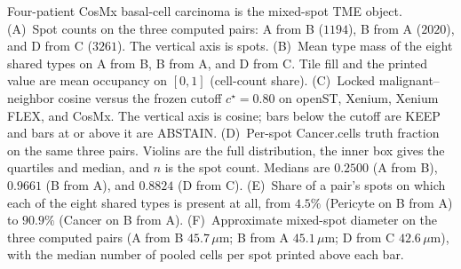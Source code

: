Four-patient CosMx basal-cell carcinoma is the mixed-spot TME object. (A)~Spot counts on the three computed pairs: A from B (\(1194\)), B from A (\(2020\)), and D from C (\(3261\)). The vertical axis is spots. (B)~Mean type mass of the eight shared types on A from B, B from A, and D from C. Tile fill and the printed value are mean occupancy on \([0,1]\) (cell-count share). (C)~Locked malignant--neighbor cosine versus the frozen cutoff \(c^\star=0.80\) on openST, Xenium, Xenium FLEX, and CosMx. The vertical axis is cosine; bars below the cutoff are KEEP and bars at or above it are ABSTAIN. (D)~Per-spot Cancer.cells truth fraction on the same three pairs. Violins are the full distribution, the inner box gives the quartiles and median, and \(n\) is the spot count. Medians are \(0.2500\) (A from B), \(0.9661\) (B from A), and \(0.8824\) (D from C). (E)~Share of a pair's spots on which each of the eight shared types is present at all, from \(4.5\%\) (Pericyte on B from A) to \(90.9\%\) (Cancer on B from A). (F)~Approximate mixed-spot diameter on the three computed pairs (A from B \(45.7\,\mu\mathrm{m}\); B from A \(45.1\,\mu\mathrm{m}\); D from C \(42.6\,\mu\mathrm{m}\)), with the median number of pooled cells per spot printed above each bar.
